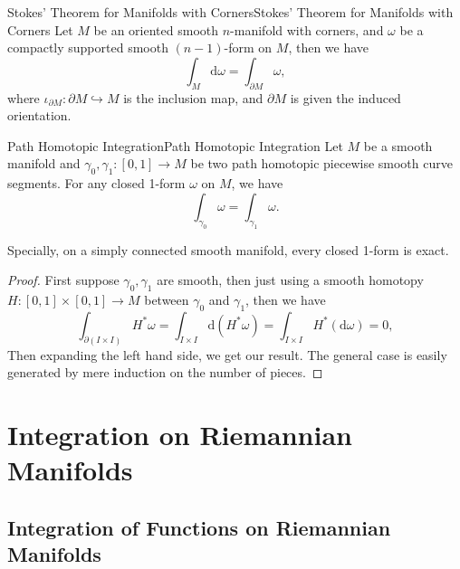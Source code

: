 \documentclass[../main.tex]{subfiles}
\begin{document}
\begin{theorem}{Stokes' Theorem for Manifolds with Corners}{Stokes' Theorem for Manifolds with Corners}
  Let $M$ be an oriented smooth $n$-manifold with corners, and $\omega$ be a compactly supported smooth $(n-1)$-form on $M$, then we have
  \begin{equation}
    \int_M \mathrm{d} \omega = \int_{\partial M} \omega,
  \end{equation}
  where $\iota_{\partial M}: \partial M \hookrightarrow M$ is the inclusion map, and $\partial M$ is given the induced orientation.
\end{theorem}

\begin{theorem}{Path Homotopic Integration}{Path Homotopic Integration}
  Let $M$ be a smooth manifold and $\gamma_0, \gamma_1: [0,1] \to M$ be two path homotopic piecewise smooth curve segments. For any closed 1-form $\omega$ on $M$, we have
  \begin{equation}
    \int_{\gamma_0} \omega = \int_{\gamma_1} \omega.
  \end{equation}

  Specially, on a simply connected smooth manifold, every closed 1-form is exact.
\end{theorem}
\begin{proof}
  First suppose $\gamma_0, \gamma_1$ are smooth, then just using a smooth homotopy $H: [0,1]\times [0,1] \to M$ between $\gamma_0$ and $\gamma_1$, then we have
  \begin{equation*}
    \int_{\partial (I \times I)} H^* \omega = \int_{I \times I} \mathrm{d} (H^* \omega) = \int_{I \times I} H^* (\mathrm{d} \omega) = 0,
  \end{equation*}
  Then expanding the left hand side, we get our result. The general case is easily generated by mere induction on the number of pieces.
\end{proof}

\section{Integration on Riemannian Manifolds}
\subsection{Integration of Functions on Riemannian Manifolds}
\end{document}
